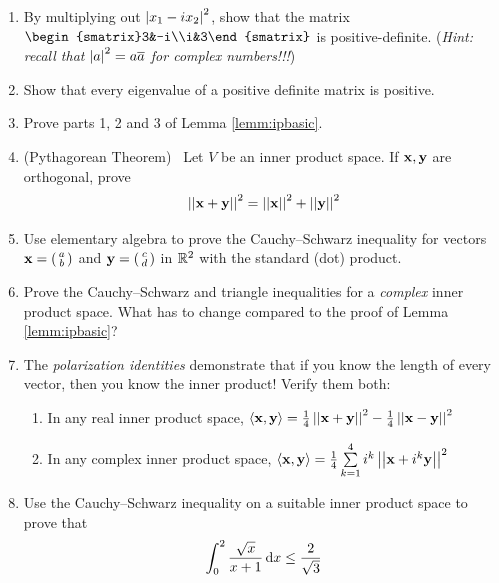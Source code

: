 \begin{exercises}
\begin{enumerate}
\begin{enumerate}
	  	\item Let $\vx=\stwovec 11$. With respect to the inner product in part (a), find a non-zero unit vector $\vy$ which is \emph{orthogonal} to $\vx$.
	  \end{enumerate}

	  
	  \item\label{exs:complexposdef} By multiplying out $\left| x_1-ix_2\right|^2$, show that the matrix $\begin{smatrix}3&-i\\i&3\end{smatrix}$ is positive-definite.\smallbreak
	  (\emph{Hint: recall that $\left| a\right|^2=a\overline{a}$ for complex numbers!!!})

	  
	  \item Show that every eigenvalue of a positive definite matrix is positive.
	  
	  
	  \item Prove parts 1, 2 and 3 of Lemma \ref{lemm:ipbasic}.
	  
	  
	  \item\label{exs:pythag} (Pythagorean Theorem) \ Let $V$ be an inner product space. If ${\mathbf{x}},{\mathbf{y}}$ are orthogonal, prove
	  \[
	  	\left| \left| {\mathbf{x}}+{\mathbf{y}}\right|\right|^2=\left| \left| {\mathbf{x}}\right|\right|^2+\left| \left| {\mathbf{y}}\right|\right|^2
	  \]
	  
	  
		\item Use elementary algebra to prove the Cauchy--Schwarz inequality for vectors ${\mathbf{x}}=\left(\begin{smallmatrix}a\\b\end{smallmatrix}\right)$ and ${\mathbf{y}}=\left(\begin{smallmatrix}c\\d\end{smallmatrix}\right)$ in $\mathbb{R}^2$ with the standard (dot) product.
		
		
		\item Prove the Cauchy--Schwarz and triangle inequalities for a \emph{complex} inner product space. What has to change compared to the proof of Lemma \ref{lemm:ipbasic}?
		
		
		\item The \emph{polarization identities} demonstrate that if you know the length of every vector, then you know the inner product! Verify them both:
		\begin{enumerate}
		  \item In any real inner product space, $\left\langle {\mathbf{x}},{\mathbf{y}}\right\rangle=\frac 14\left| \left| {\mathbf{x}}+{\mathbf{y}}\right|\right|^2 -\frac 14\left| \left| {\mathbf{x}}-{\mathbf{y}}\right|\right|^2$
		  \item In any complex inner product space, $\left\langle {\mathbf{x}},{\mathbf{y}}\right\rangle=\frac 14\sum\limits_{k=1}^4i^k\left| \left| {\mathbf{x}}+i^k{\mathbf{y}}\right|\right|^2$
		\end{enumerate}
		
		
		\item Use the Cauchy--Schwarz inequality on a suitable inner product space to prove that
		\[
			\int_0^2\frac{\sqrt x}{x+1}\,{\mathrm{d} x}\le \frac 2{\sqrt 3}
		\]
	

\end{enumerate}
\end{exercises}
